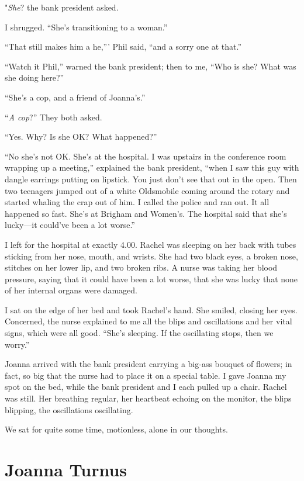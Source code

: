 "\emph{She}? the bank president asked.

I shrugged. ``She's transitioning to a woman.''

``That still makes him a he,''' Phil said, ``and a sorry one at that.''

``Watch it Phil,'' warned the bank president; then to me, ``Who is she?
What was she doing here?''

``She's a cop, and a friend of Joanna's.''

``\emph{A cop}?'' They both asked.

``Yes. Why? Is she OK? What happened?''

``No she's not OK. She's at the hospital. I was upstairs in the
conference room wrapping up a meeting,'' explained the bank president,
``when I saw this guy with dangle earrings putting on lipstick. You just
don't see that out in the open. Then two teenagers jumped out of a white
Oldsmobile coming around the rotary and started whaling the crap out of
him. I called the police and ran out. It all happened so fast. She's at
Brigham and Women's. The hospital said that she's lucky---it could've
been a lot worse.''

I left for the hospital at exactly 4.00. Rachel was sleeping on her back
with tubes sticking from her nose, mouth, and wrists. She had two black
eyes, a broken nose, stitches on her lower lip, and two broken ribs. A
nurse was taking her blood pressure, saying that it could have been a
lot worse, that she was lucky that none of her internal organs were
damaged.

I sat on the edge of her bed and took Rachel's hand. She smiled, closing
her eyes. Concerned, the nurse explained to me all the blips and
oscillations and her vital signs, which were all good. ``She's sleeping.
If the oscillating stops, then we worry.''

Joanna arrived with the bank president carrying a big-ass bouquet of
flowers; in fact, so big that the nurse had to place it on a special
table. I gave Joanna my spot on the bed, while the bank president and I
each pulled up a chair. Rachel was still. Her breathing regular, her
heartbeat echoing on the monitor, the blips blipping, the oscillations
oscillating.

We sat for quite some time, motionless, alone in our thoughts.

\chapter{Joanna Turnus}

